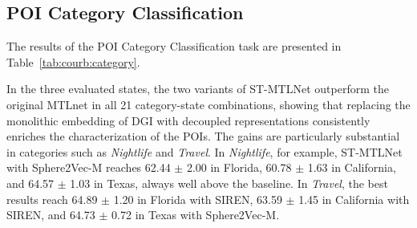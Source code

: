 \subsection{POI Category Classification}

The results of the POI Category Classification task are presented in Table~\ref{tab:courb:category}.

In the three evaluated states, the two variants of ST-MTLNet outperform the original MTLnet in all 21 category-state combinations, showing that replacing the monolithic embedding of DGI with decoupled representations consistently enriches the characterization of the POIs. The gains are particularly substantial in categories such as \textit{Nightlife} and \textit{Travel}. In \textit{Nightlife}, for example, ST-MTLNet with Sphere2Vec-M reaches 62.44 $\pm$ 2.00 in Florida, 60.78 $\pm$ 1.63 in California, and 64.57 $\pm$ 1.03 in Texas, always well above the baseline. In \textit{Travel}, the best results reach 64.89 $\pm$ 1.20 in Florida with SIREN, 63.59 $\pm$ 1.45 in California with SIREN, and 64.73 $\pm$ 0.72 in Texas with Sphere2Vec-M.

